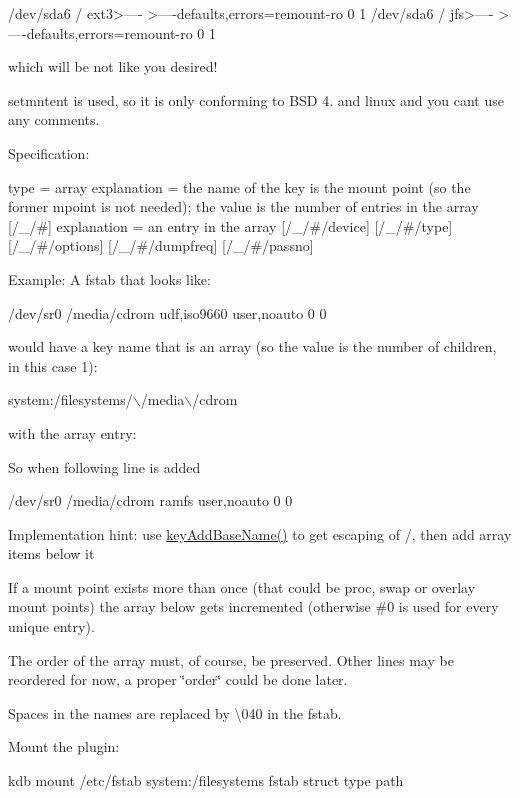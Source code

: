 \begin{DoxyCode}
/dev/sda6       /               ext3>----   >----defaults,errors=remount-ro 0 1
/dev/sda6       /               jfs>----   >----defaults,errors=remount-ro 0 1
\end{DoxyCode}


which will be not like you desired!

setmntent is used, so it is only conforming to B\+SD 4. and linux and you can\textquotesingle{}t use any comments.

Specification\+:


\begin{DoxyCode}
[/\_]
type = array
explanation = the name of the key is the mount point (so the former
  mpoint is not needed); the value is the number of entries in the
  array
[/\_/#]
explanation = an entry in the array
[/\_/#/device]
[/\_/#/type]
[/\_/#/options]
[/\_/#/dumpfreq]
[/\_/#/passno]
\end{DoxyCode}


Example\+: A fstab that looks like\+:


\begin{DoxyCode}
/dev/sr0        /media/cdrom   udf,iso9660 user,noauto     0       0
\end{DoxyCode}


would have a key name that is an array (so the value is the number of children, in this case 1)\+:


\begin{DoxyCode}
system:/filesystems/\(\backslash\)/media\(\backslash\)/cdrom
\end{DoxyCode}


with the array entry\+:




So when following line is added


\begin{DoxyCode}
/dev/sr0        /media/cdrom   ramfs user,noauto     0       0
\end{DoxyCode}


Implementation hint\+: use {\ttfamily \hyperlink{group__keyname_gaa942091fc4bd5c2699e49ddc50829524}{key\+Add\+Base\+Name()}} to get escaping of {\ttfamily /}, then add array items below it

If a mount point exists more than once (that could be proc, swap or overlay mount points) the array below gets incremented (otherwise \#0 is used for every unique entry).

The order of the array must, of course, be preserved. Other lines may be reordered for now, a proper \char`\"{}order\char`\"{} could be done later.

Spaces in the names are replaced by \textbackslash{}040 in the fstab.

Mount the plugin\+:


\begin{DoxyCode}
kdb mount /etc/fstab system:/filesystems fstab struct type path
\end{DoxyCode}
 